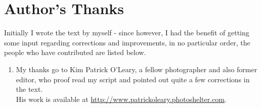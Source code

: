 \section*{Author's Thanks}

Initially I wrote the text by myself - since however, I had the benefit of getting some input regarding corrections and improvements, in no particular order, the people who have contributed are listed below.

\begin{enumerate}[-]
	\item My thanks go to Kim Patrick O'Leary, a fellow photographer and also former editor, who proof read my script and pointed out quite a few corrections in the text. \\
His work is available at \url{http://www.patrickoleary.photoshelter.com}.
\end{enumerate}

